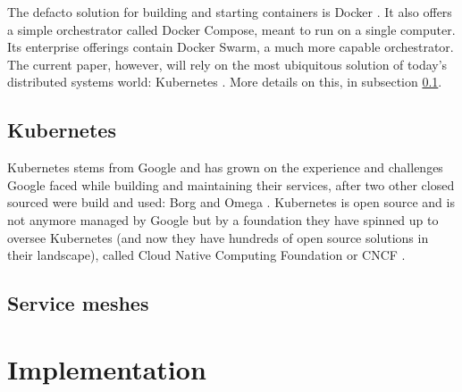 \documentclass[conference]{IEEEtran}
\begin{document}
    The defacto solution for building and starting containers is Docker \cite{b8}. It also offers a simple orchestrator called Docker Compose, meant to run on a single computer. Its enterprise offerings contain Docker Swarm, a much more capable orchestrator. The current paper, however, will rely on the most ubiquitous solution of today's distributed systems world: Kubernetes \cite{b9}. More details on this, in subsection \ref{subsec:kube}.


\subsection{Kubernetes}
\label{subsec:kube}

    Kubernetes stems from Google and has grown on the experience and challenges Google faced while building and maintaining their services, after two other closed sourced were build and used: Borg and Omega \cite{b9}. Kubernetes is open source and is not anymore managed by Google but by a foundation they have spinned up to oversee Kubernetes (and now they have hundreds of open source solutions in their landscape), called Cloud Native Computing Foundation or CNCF \cite{b11}.

    

\subsection{Service meshes}

\section{Implementation}
\end{document}
